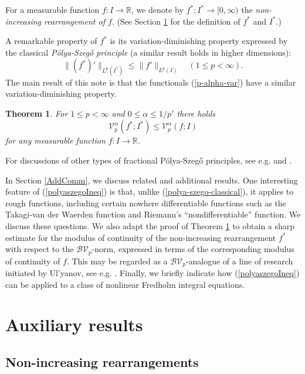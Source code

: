 \documentclass{amsart}
\newtheorem{theorem}{Theorem}[section]
\numberwithin{equation}{section}
\begin{document}
For a measurable function $f:I\rightarrow\mathbb{R}$, we denote by $f^*:I^*\rightarrow[0,\infty)$ the \emph{non-increasing rearrangement of $f$}. (See Section \ref{Aux} for the definition of $f^*$ and $I^*$.)

A remarkable property of $f^*$  is its variation-diminishing property expressed by the classical \emph{P\'{o}lya-Szeg\H{o} principle} \cite{PoSz51} (a similar result holds in higher dimensions): 
\begin{equation}
    \label{polya-szego-classical}
    \|(f^*)'\|_{L^p(I^*)}\le\|f'\|_{L^p(I)}\quad(1\le p<\infty).
\end{equation}
The main result of this note is that the functionals (\ref{p-alpha-var}) have a similar variation-diminishing property.
\begin{theorem}
    \label{mainTeo}
    For $1\le p<\infty$ and $0\le\alpha\le1/p'$ there holds
    \begin{equation}
    \label{polyaszegoIneq}
    \mathcal{V}_p^\alpha(f^*;I^*)\le\mathcal{V}_p^\alpha(f;I)
    \end{equation}
    for any measurable function $f:I\rightarrow\mathbb{R}$.
\end{theorem}
For discussions of other types of fractional P\'{o}lya-Szeg\H{o} principles, see e.g. \cite{Ko07} and \cite{Ca26}. 

In Section \ref{AddComm}, we discuss related and additional results. 
One interesting feature of (\ref{polyaszegoIneq}) is that, unlike (\ref{polya-szego-classical}), it applies to rough functions, including certain nowhere differentiable functions such as the Takagi-van der Waerden function and Riemann's ``nondifferentiable'' function. We discuss these questions. We also adapt the proof of Theorem \ref{mainTeo} to obtain a sharp estimate for the modulus of continuity of the non-increasing rearrangement $f^*$ with respect to the $\mathcal{BV}_p$-norm, expressed in terms of the corresponding modulus of continuity of $f$. This may be regarded as a $\mathcal{BV}_p$-analogue of a line of research initiated by Ul'yanov, see e.g. \cite{Ko07}.
Finally, we briefly indicate how (\ref{polyaszegoIneq}) can be applied to a class of nonlinear Fredholm integral equations.

\section{Auxiliary results}
\label{Aux}

\subsection{Non-increasing rearrangements}
\end{document}
